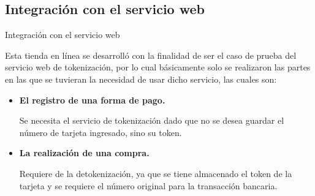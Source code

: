%
%
%

\subsection{Integración con el servicio web}

\begin{frame}{Integración con el servicio web}
  
  Esta tienda en línea se desarrolló con la finalidad de ser el caso de prueba
  del servicio web de tokenización, por lo cual básicamente solo se realizaron
  las partes en las que se tuvieran la necesidad de usar dicho servicio, las
  cuales son:

  \begin{itemize}
    \item \textbf{El registro de una forma de pago.}

      Se necesita el servicio de tokenización dado que no se desea guardar
      el número de tarjeta ingresado, sino su token.
      \newline

    \item \textbf{La realización de una compra.}

      Requiere de la detokenización, ya que se tiene almacenado el token de
      la tarjeta y se requiere el número original para la transacción bancaria.

  \end{itemize}


\end{frame}
